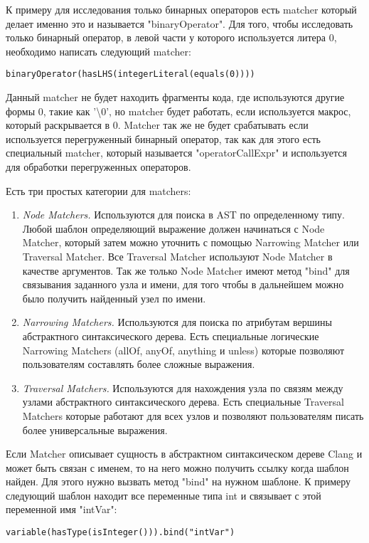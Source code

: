 К примеру для исследования только бинарных операторов есть matcher который делает именно это и называется 
"binaryOperator". Для того, чтобы исследовать только бинарный оператор, в левой части у которого 
используется литера 0, необходимо написать следующий matcher: 
\begin{lstlisting}
binaryOperator(hasLHS(integerLiteral(equals(0))))
\end{lstlisting}
Данный matcher не будет находить фрагменты кода, где используются другие формы 0, такие как '\textbackslash0',
но matcher будет работать, если используется макрос, который раскрывается в 0. Matcher так же 
не будет срабатывать если используется перегруженный бинарный оператор, так как для этого 
есть специальный matcher, который называется "operatorCallExpr" и используется для обработки 
перегруженных операторов. 

Есть три простых категории для matchers:
\begin{enumerate}
	\item \textit{Node Matchers.} Используются для поиска в AST по определенному типу. Любой шаблон
определяющий выражение должен начинаться с Node Matcher, который затем можно уточнить с помощью
Narrowing Matcher или Traversal Matcher. Все Traversal Matcher используют Node Matcher в качестве аргументов.
Так же только Node Matcher имеют метод "bind" для связывания заданного узла и имени, для того чтобы в дальнейшем
можно было получить найденный узел по имени.
	\item \textit{Narrowing Matchers.} Используются для поиска по атрибутам вершины абстрактного
синтаксического дерева. Есть специальные логические Narrowing Matchers (allOf, anyOf, anything и unless) 
которые позволяют пользователям составлять более сложные выражения. 
	\item \textit{Traversal Matchers.} Используются для нахождения узла по связям между узлами 
абстрактного синтаксического дерева. Есть специальные Traversal Matchers которые работают для 
всех узлов и позволяют пользователям писать более универсальные выражения.
\end{enumerate}

Если Matcher описывает сущность в абстрактном синтаксическом дереве Clang и может быть 
связан с именем, то на него можно получить ссылку когда шаблон найден. Для этого нужно
вызвать метод "bind" на нужном шаблоне. К примеру следующий шаблон находит все переменные типа
int и связывает с этой переменной имя "intVar":
\begin{lstlisting}
variable(hasType(isInteger())).bind("intVar")
\end{lstlisting}


